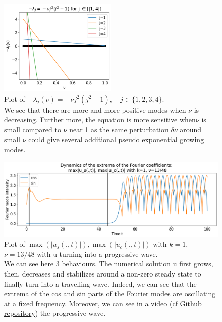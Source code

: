 \documentclass[12pt]{article}
\begin{document}
\begin{figure}[h]
\centering
\includegraphics[width=0.5\textwidth]{KS_eq/plot_lambda_nu.png}
\caption{Plot of $-\lambda_j(\nu) = -\nu j^2(j^2-1), \quad j\in \{1, 2, 3, 4\}.$\\ We see that there are more and more positive modes when $\nu$ is decreasing. Further more, the equation is more sensitive
 when$\nu$  is small compared to $\nu$ near 1 as the same perturbation $\delta \nu$ around small $\nu$ could give several 
 additional pseudo exponential growing modes.   }
\label{fig:KS_eq_nu_inf_1}
\end{figure}


\begin{figure}[h]
\centering
\includegraphics[width=1\textwidth]{KS_eq/KS_extrema_Fourier_coef.png}
\caption{Plot of $\max(|u_s(.,t)|), \max(|u_c(.,t)|)$ with $k=1$, $\nu = 13/48$ with u turning into a progressive wave. \\
 We can see here 3 behaviours. The numerical solution u first grows, then, decreases and stabilizes around a non-zero steady state to finally
 turn into a travelling wave. Indeed, we can see that the extrema of the cos and sin parts of the Fourier modes are oscillating at a fixed frequency.
 Moreover, we can see in a video (cf \href{https://github.com/Bilal59170/Repo_Warwick_internship}{Github repository}) the progressive wave.}
\label{fig:KS_eq_nu_inf_1_prog_wave}
\end{figure}
\end{document}
